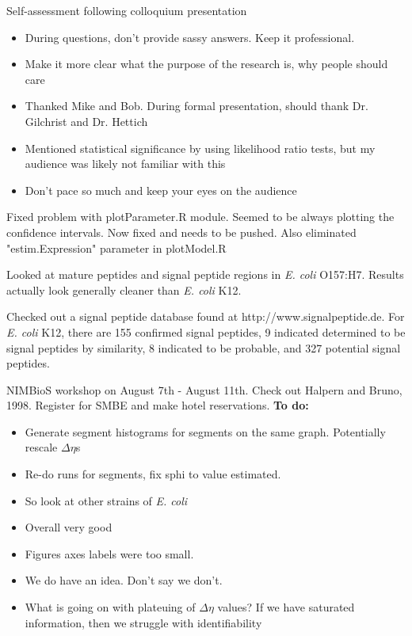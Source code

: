 \documentclass[11pt]{labbook}
\begin{document}

Self-assessment following colloquium presentation
\begin{itemize}
\item During questions, don't provide sassy answers. Keep it professional.
\item Make it more clear what the purpose of the research is, why people should care
\item Thanked Mike and Bob. During formal presentation, should thank Dr. Gilchrist and Dr. Hettich
\item Mentioned statistical significance by using likelihood ratio tests, but my audience was likely not familiar with this
\item Don't pace so much and keep your eyes on the audience
\end{itemize}

Fixed problem with plotParameter.R module. Seemed to be always plotting the confidence intervals. Now fixed and needs to be pushed. Also eliminated "estim.Expression" parameter in plotModel.R

Looked at mature peptides and signal peptide regions in \textit{E. coli} O157:H7. Results actually look generally cleaner than \textit{E. coli} K12. 




Checked out a signal peptide database found at http://www.signalpeptide.de. For \textit{E. coli} K12, there are 155 confirmed signal peptides, 9 indicated determined to be signal peptides by similarity, 8 indicated to be probable, and 327 potential signal peptides. 

NIMBioS workshop on August 7th - August 11th.
Check out Halpern and Bruno, 1998.
Register for SMBE and make hotel reservations.
\textbf{To do:}
\begin{itemize}
\item Generate segment histograms for segments on the same graph. Potentially rescale $\Delta\eta$s  
\item Re-do runs for segments, fix sphi to value estimated. 
\item So look at other strains of \textit{E. coli} 
\end{itemize}

\begin{itemize}
\item Overall very good
\item Figures axes labels were too small. 
\item We do have an idea. Don't say we don't. 
\item What is going on with plateuing of $\Delta\eta$ values? If we have saturated information, then we struggle with identifiability
\end{itemize}
\end{document}
